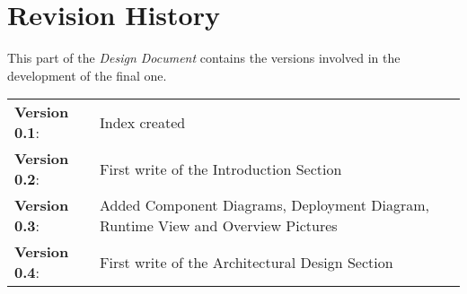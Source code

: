 \section{Revision History}

This part of the \emph{Design Document} contains the versions involved in the development of the final one.

\vspace{10pt}

\begin{tabular}{l l}

	\textbf{Version 0.1}:   & Index created \\
	\textbf{Version 0.2}:   & First write of the Introduction Section \\
	\textbf{Version 0.3}:   & Added Component Diagrams, Deployment Diagram, Runtime View and Overview Pictures \\
	\textbf{Version 0.4}:   & First write of the Architectural Design Section \\
	
\end{tabular}